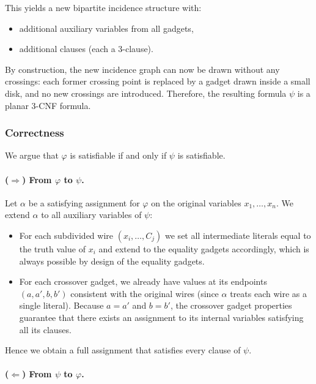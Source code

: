 \documentclass[9pt]{extarticle}
\begin{document}
This yields a new bipartite incidence structure with:
\begin{itemize}
    \item additional auxiliary variables from all gadgets,
    \item additional clauses (each a 3-clause).
\end{itemize}
By construction, the new incidence graph can now be drawn without any crossings:
each former crossing point is replaced by a gadget drawn inside a small disk,
and no new crossings are introduced.  Therefore, the resulting formula $\psi$ is
a planar 3-CNF formula.

\subsubsection*{Correctness}

We argue that $\varphi$ is satisfiable if and only if $\psi$ is satisfiable.

\paragraph{($\Rightarrow$) From $\varphi$ to $\psi$.}

Let $\alpha$ be a satisfying assignment for $\varphi$ on the original variables
$x_1,\dots,x_n$.  We extend $\alpha$ to all auxiliary variables of $\psi$:

\begin{itemize}
    \item For each subdivided wire $(x_i,\dots,C_j)$ we set all intermediate
          literals equal to the truth value of $x_i$ and extend to the equality
          gadgets accordingly, which is always possible by design of the
          equality gadgets.
    \item For each crossover gadget, we already have values at its endpoints
          $(a,a',b,b')$ consistent with the original wires (since $\alpha$
          treats each wire as a single literal).  Because $a=a'$ and $b=b'$, the
          crossover gadget properties guarantee that there exists an assignment
          to its internal variables satisfying all its clauses.
\end{itemize}

Hence we obtain a full assignment that satisfies every clause of $\psi$.

\paragraph{($\Leftarrow$) From $\psi$ to $\varphi$.}
\end{document}
